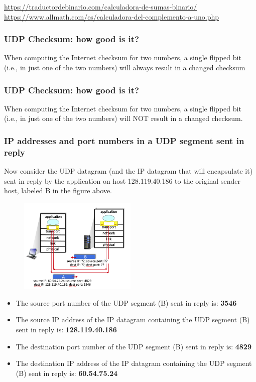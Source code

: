     \url{https://traductordebinario.com/calculadora-de-sumas-binario/}
    \linebreak
    \url{https://www.allmath.com/es/calculadora-del-complemento-a-uno.php}
        

    \subsubsection*{UDP Checksum: how good is it?}
    \noindent When computing the Internet checksum for two numbers, a single flipped bit (i.e., in just one of
    the two numbers) will always result in a changed checksum

    \subsubsection*{UDP Checksum: how good is it?}
    \noindent When computing the Internet checksum for two numbers, a single flipped bit (i.e., in just one of
    the two numbers) will NOT result in a changed checksum.

    \subsubsection*{IP addresses and port numbers in a UDP segment sent in reply}
    \noindent Now consider the UDP datagram (and the IP datagram that will encapsulate it) sent in reply by the
    application on host 128.119.40.186  to the original sender host, labeled B in the figure above.
    \begin{figure}[H]
        \centering
        \includegraphics[width=0.5\textwidth]{img/3.3.9.jpg}
        \label{fig:UDP}
    \end{figure}
    \begin{itemize}
        \item The source port number of the UDP segment (B) sent in reply is: \textbf{3546}
        \item The source IP address of the IP datagram containing the UDP segment (B) sent in reply is: \textbf{128.119.40.186}
        \item The destination port number of the UDP segment (B) sent in reply  is: \textbf{4829}
        \item The destination IP address of the IP datagram containing the UDP segment (B) sent in reply is: \textbf{60.54.75.24}
    \end{itemize}

